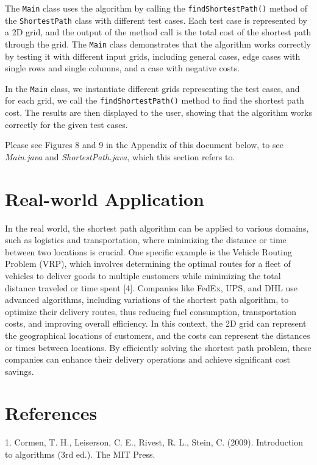 \documentclass[12pt]{article}
\begin{document}
The \texttt{Main} class uses the algorithm by calling the \texttt{findShortestPath()} method of the \texttt{ShortestPath} class with different test cases. Each test case is represented by a 2D grid, and the output of the method call is the total cost of the shortest path through the grid. The \texttt{Main} class demonstrates that the algorithm works correctly by testing it with different input grids, including general cases, edge cases with single rows and single columns, and a case with negative costs.

In the \texttt{Main} class, we instantiate different grids representing the test cases, and for each grid, we call the \texttt{findShortestPath()} method to find the shortest path cost. The results are then displayed to the user, showing that the algorithm works correctly for the given test cases.

Please see Figures 8 and 9 in the Appendix of this document below, to see \textit{Main.java} and \textit{ShortestPath.java}, which this section refers to.

\section*{Real-world Application}

In the real world, the shortest path algorithm can be applied to various domains, such as logistics and transportation, where minimizing the distance or time between two locations is crucial. One specific example is the Vehicle Routing Problem (VRP), which involves determining the optimal routes for a fleet of vehicles to deliver goods to multiple customers while minimizing the total distance traveled or time spent [4]. Companies like FedEx, UPS, and DHL use advanced algorithms, including variations of the shortest path algorithm, to optimize their delivery routes, thus reducing fuel consumption, transportation costs, and improving overall efficiency. In this context, the 2D grid can represent the geographical locations of customers, and the costs can represent the distances or times between locations. By efficiently solving the shortest path problem, these companies can enhance their delivery operations and achieve significant cost savings.

\section*{References}

1. Cormen, T. H., Leiserson, C. E., Rivest, R. L., Stein, C. (2009). Introduction to algorithms (3rd ed.). The MIT Press.
\end{document}
